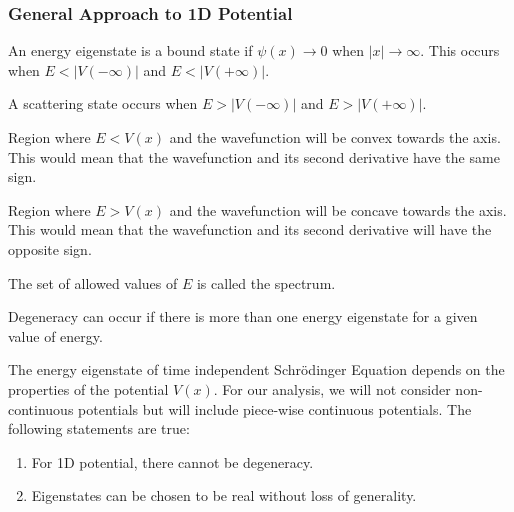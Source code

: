 \documentclass[a4paper]{article}
\begin{document}
\subsubsection*{General Approach to 1D Potential}
\begin{defi}
An energy eigenstate is a bound state if $\psi(x)\rightarrow 0$ when $|x|\rightarrow \infty$. This occurs when $E<|V(-\infty)|$ and $E<|V(+\infty)|$.
\end{defi}
\begin{defi} 
A scattering state occurs when $E>|V(-\infty)|$ and $E>|V(+\infty)|$.
\end{defi}
\begin{defi}
Region where $E<V(x)$ and the wavefunction will be convex towards the axis. This would mean that the wavefunction and its second derivative have the same sign. 
\end{defi}
\begin{defi}
Region where $E>V(x)$ and the wavefunction will be concave towards the axis. This would mean that the wavefunction and its second derivative will have the opposite sign.
\end{defi}
\begin{defi}[Spectrum]
The set of allowed values of $E$ is called the spectrum.
\end{defi}
\begin{defi}[Degeneracy]
Degeneracy can occur if there is more than one energy eigenstate for a given value of energy.
\end{defi}
\begin{thm}
The energy eigenstate of time independent Schr\"{o}dinger Equation depends on the properties of the potential $V(x)$. For our analysis, we will not consider non-continuous potentials but will include piece-wise continuous potentials. The following statements are true:
\begin{enumerate}
    \item For 1D potential, there cannot be degeneracy. 
    \item Eigenstates can be chosen to be real without loss of generality.
\end{enumerate}
\end{thm}
\end{document}
